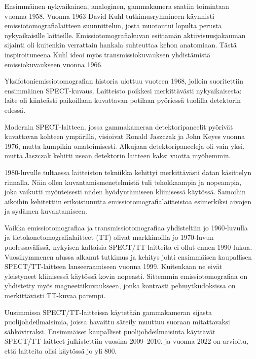 Ensimmäinen nykyaikainen, analoginen, gammakamera saatiin toimintaan vuonna 1958\cite{hutton_origins_2014, cherry_gamma_2012}. Vuonna 1963 David Kuhl tutkimusryhmineen käynnisti emissiotomografialaitteen suunnittelun, josta muotoutui lopulta perusta nykyaikaisille laitteille\cite{jaszczak_early_2006, hutton_origins_2014}. Emissiotomografiakuvan esittämän aktiivisuusjakauman sijainti oli kuitenkin verrattain hankala suhteuttaa kehon anatomiaan. Tästä inspiroituneena Kuhl ideoi myös transmissiokuvauksen yhdistämistä emissiokuvaukseen vuonna 1966\cite{jaszczak_early_2006}.

Yksifotoniemissiotomografian historia ulottuu vuoteen 1968, jolloin suoritettiin ensimmäinen SPECT-kuvaus. Laitteisto poikkesi merkittävästi nykyaikaisesta: laite oli kiinteästi paikoillaan kuvattavan potilaan pyöriessä tuolilla detektorin edessä.\cite{jaszczak_early_2006, hutton_origins_2014}

Modernin SPECT-laitteen, jossa gammakameran detektoripaneelit pyörivät kuvattavan kohteen ympärillä, visioivat Ronald Jaszczak ja John Keyes vuonna 1976, mutta kumpikin omatoimisesti\cite{jaszczak_early_2006}. Alkujaan detektoripaneeleja oli vain yksi, mutta Jaszczak kehitti usean detektorin laitteen kaksi vuotta myöhemmin\cite{jaszczak_early_2006, hutton_origins_2014}.

1980-luvulle tultaessa laitteiston tekniikka kehittyi merkittävästi datan käsittelyn rinnalla. Näin ollen kuvantamismenetelmistä tuli tehokkaampia ja nopeampia, joka vaikutti myönteisesti niiden hyödyntämiseen kliinisessä käytössä\cite{jaszczak_early_2006}. Samoihin aikoihin kehitettiin erikoistunutta emissiotomografialaitteistoa esimerkiksi aivojen ja sydämen kuvantamiseen\cite{hutton_origins_2014}.

Vaikka emissiotomografiaa ja transmissiotomografiaa yhdisteltiin jo 1960-luvulla ja tietokonetomografialaitteet (TT) olivat markkinoilla jo 1970-luvun puolessavälissä, nykyisen kaltaisia SPECT/TT-laitteita ei ollut ennen 1990-lukua\cite{bercovich_medical_2018, hutton_origins_2014}. Vuosikymmenen alussa alkanut tutkimus ja kehitys johti ensimmäisen kaupallisen SPECT/TT-laitteen lanseeraamiseen vuonna 1999. Kuitenkaan ne eivät yleistyneet kliinisessä käytössä kovin nopeasti.\cite{hutton_origins_2014} Sittemmin emissiotomografiaa on yhdistetty myös magneettikuvaukseen, jonka kontrasti pehmytkudoksissa on merkittävästi TT-kuvaa parempi\cite{wettenhovi_omegaopen-source_2021}.

Uusimmissa SPECT/TT-laitteissa käytetään gammakameran sijasta puolijohdeilmaisimia, joissa havaittu säteily muuttuu suoraan mitattavaksi sähkövirraksi. Ensimmäiset kaupalliset puolijohdeilmaisinta käyttävät SPECT/TT-laitteet julkistettiin vuosina 2009--2010.\cite{hutton_origins_2014} ja vuonna 2022 on arvioitu, että laitteita olisi käytössä jo yli 800\cite{slomka_novel_2022}.

